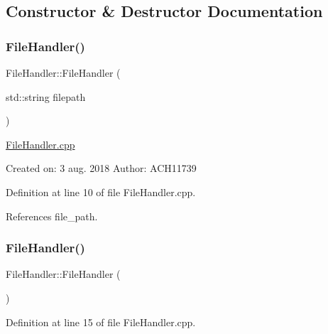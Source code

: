 \subsection{Constructor \& Destructor Documentation}
\mbox{\label{class_file_handler_ab6dc27856e7eef893879d381d62dbc32}} 
\subsubsection{\texorpdfstring{File\+Handler()}{FileHandler()}\hspace{0.1cm}{\footnotesize\ttfamily [1/2]}}
{\footnotesize\ttfamily File\+Handler\+::\+File\+Handler (\begin{DoxyParamCaption}\item[{std\+::string}]{filepath }\end{DoxyParamCaption})}

\mbox{\hyperlink{_file_handler_8cpp}{File\+Handler.\+cpp}}

Created on\+: 3 aug. 2018 Author\+: A\+C\+H11739 

Definition at line 10 of file File\+Handler.\+cpp.



References file\+\_\+path.

\mbox{\label{class_file_handler_a0d1ac8e9911e19255e8b2d99c2d93f43}} 
\subsubsection{\texorpdfstring{File\+Handler()}{FileHandler()}\hspace{0.1cm}{\footnotesize\ttfamily [2/2]}}
{\footnotesize\ttfamily File\+Handler\+::\+File\+Handler (\begin{DoxyParamCaption}{ }\end{DoxyParamCaption})}



Definition at line 15 of file File\+Handler.\+cpp.

\mbox{\label{class_file_handler_a1ce10cd0ad31b313a8d526fba6f1e676}} 
